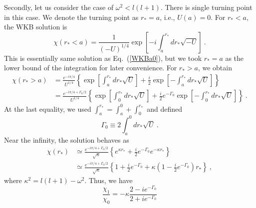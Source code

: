 \documentclass[a4paper,11pt]{article}
\begin{document}
    Secondly, let us consider the case of $\omega^2<l(l+1)$. There is single turning point in this case.
    We denote the turning point as $r_\ast=a$, i.e., $U(a)=0$. For $r_\ast<a$, the WKB solution is 
    \begin{equation}
        \chi(r_\ast<a) = \frac{1}{(-U)^{1/4}} \exp\left[-i\int_a^{r_\ast} dr_\ast  \sqrt{-U}\right]\ .
        \label{WKBa}
    \end{equation}
    This is essentially same solution as Eq.~(\ref{WKBa0}), but we took $r_\ast=a$ as the lower bound of the integration for later convenience.
    For $r_\ast>a$, we obtain
    \begin{equation}
        \begin{split}
         \chi(r_\ast>a) &= \frac{e^{-i\pi/4}}{U^{1/4}}\left\{\exp\left[\int_a^{r_\ast} dr_\ast  \sqrt{U}\right]
        +\frac{i}{2}\exp\left[-\int_a^{r_\ast} dr_\ast  \sqrt{U}\right]
        \right\}\\
        &= \frac{e^{-i\pi/4+\Gamma_0/2}}{U^{1/4}}\left\{\exp\left[\int_0^{r_\ast} dr_\ast  \sqrt{U}\right]
        +\frac{i}{2}e^{-\Gamma_0}\exp\left[-\int_0^{r_\ast} dr_\ast  \sqrt{U}\right]\right\}\ .
        \end{split}
        \label{WKBab}
    \end{equation}
    At the last equality, we used $\int_a^{r_\ast}=\int_a^0+\int_0^{r_\ast}$ and defined
    \begin{equation}
        \Gamma_0 \equiv 2\int_a^0 dr_\ast  \sqrt{U}\ .
    \end{equation}
    Near the infinity, the solution behaves as
    \begin{equation}
        \begin{split}
         \chi(r_\ast)&\simeq \frac{e^{-i\pi/4+\Gamma_0/2}}{\sqrt{\kappa}}\left\{e^{\kappa r_\ast}
        +\frac{i}{2}e^{-\Gamma_0}e^{-\kappa r_\ast}\right\}\\
        &\simeq\frac{e^{-i\pi/4+\Gamma_0/2}}{\sqrt{\kappa}}\left\{1+\frac{i}{2}e^{-\Gamma_0}+\kappa (1-\frac{i}{2}e^{-\Gamma_0}) r_\ast \right\}\ ,
        \end{split}
    \end{equation}
    where $\kappa^2=l(l+1)-\omega^2$. 
    Thus, we have
    \begin{equation}
        \frac{\chi_1}{\chi_0}= -\kappa \frac{2-ie^{-\Gamma_0}}{2+ie^{-\Gamma_0}}
    \end{equation}


\end{document}
